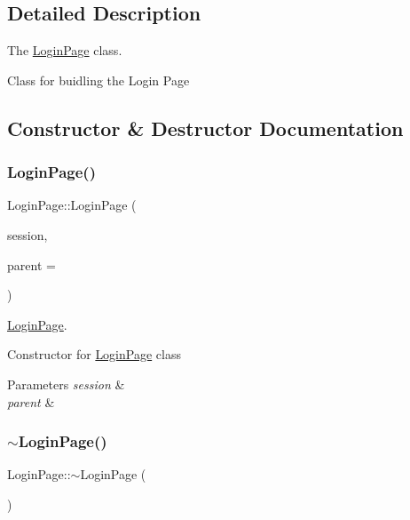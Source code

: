\subsection{Detailed Description}
The \hyperlink{class_login_page}{Login\+Page} class. 

Class for buidling the Login Page 

\subsection{Constructor \& Destructor Documentation}
\mbox{\label{class_login_page_aabf302d725edb6a1a0e8cca53f9b3fbf}} 
\subsubsection{\texorpdfstring{Login\+Page()}{LoginPage()}}
{\footnotesize\ttfamily Login\+Page\+::\+Login\+Page (\begin{DoxyParamCaption}\item[{\hyperlink{class_session}{Session} $\ast$}]{session,  }\item[{Q\+Widget $\ast$}]{parent = {} }\end{DoxyParamCaption})\hspace{0.3cm}{\ttfamily [explicit]}}



\hyperlink{class_login_page}{Login\+Page}. 

Constructor for \hyperlink{class_login_page}{Login\+Page} class 
\begin{DoxyParams}{Parameters}
{\em session} & \\
\hline
{\em parent} & \\
\hline
\end{DoxyParams}
\mbox{\label{class_login_page_ae3c843938f34258ac50eb89d30d31d8a}} 
\subsubsection{\texorpdfstring{$\sim$\+Login\+Page()}{~LoginPage()}}
{\footnotesize\ttfamily Login\+Page\+::$\sim$\+Login\+Page (\begin{DoxyParamCaption}{ }\end{DoxyParamCaption})}



